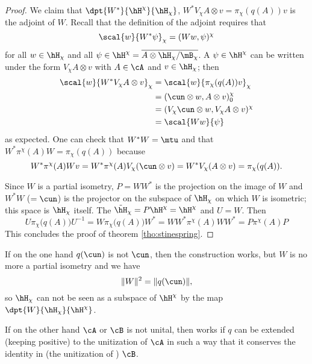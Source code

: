 \begin{proof}
We claim that $\dpt{ W^* }{ \hH^{\chi} }{ \hH_{\chi} }$, $W^*V_{\chi} A\otimes v=\pi_{\chi}(q(A))v$ is the adjoint of $W$. Recall that the definition of the adjoint requires that 
\[ 
  \scal{ w }{ W^*\psi }_{\chi}=( Ww , \psi )^{\chi}
\]
for all $w\in\hH_{\chi}$ and all $\psi\in\hH^{\chi}=\overline{ A\otimes\hH_{\chi}/\mB_{\chi} }$. A $\psi\in\hH^{\chi}$ can be written under the form $V_{\chi}A\otimes v$ with $A\in\cA$ and $v\in\hH_{\chi}$; then
\begin{equation}
\begin{split}
\scal{ w }{ W^*V_{\chi}A\otimes v }_{\chi}&=\scal{ w }{ \pi_{\chi}(q(A))v }_{\chi}\\
        &=( \cun\otimes w , A\otimes v )_0^{\chi}\\
        &=( V_{\chi}\cun\otimes w , V_{\chi}A\otimes v )^{\chi}\\
        &=\scal{ Ww }{ \psi }
\end{split}
\end{equation}
as expected. One can check that $W^*W=\mtu$ and that $W^*\pi^{\chi}(A)W=\pi_{\chi}(q(A))$ because
\begin{equation}
  W^*\pi^{\chi}(A)Wv=W^*\pi^{\chi}(A)V_{\chi}(\cun\otimes v)
        =W^*V_{\chi}(A\otimes v)
        =\pi_{\chi}(q(A)).
\end{equation}


Since $W$ is a partial isometry, $P=WW^*$ is the projection on the image of $W$ and $W^*W$ ($=\cun$) is the projector on the subspace of $\hH_{\chi}$ on which $W$ is isometric; this space is $\hH_{\chi}$ itself. The $\tilde\hH_{\chi}=P\hH^{\chi}=\hH^{\chi}$ and $U=W$. Then
\begin{equation}
  U\pi_{\chi}\big( q(A) \big)U^{-1}=W\pi_{\chi}\big( q(A) \big)W^*
        =WW^*\pi^{\chi}(A)WW^*
        =P\pi^{\chi}(A)P
\end{equation}
This concludes the proof of theorem \ref{tho:stinespring}.

\end{proof}


\begin{remark}
If on the one hand $q(\cun)$ is not $\cun$, then the construction works, but $W$ is no more a partial isometry and we have
\[ 
  \| W \|^2=\| q(\cun) \|,
\]
so $\hH_{\chi}$ can not be seen as a subspace of $\hH^{\chi}$ by the map $\dpt{W}{ \hH_{\chi} }{ \hH^{\chi} }$.

If on the other hand $\cA$ or $\cB$ is not unital, then works if $q$ can be extended (keeping positive) to the unitization of $\cA$ in such a way that it conserves the identity in (the unitization of ) $\cB$.

\end{remark}

